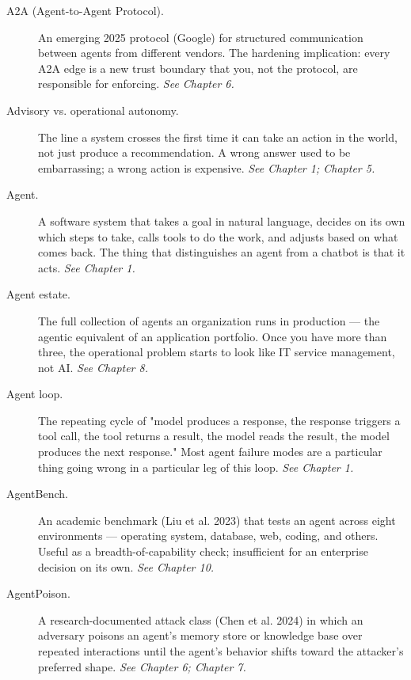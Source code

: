 \label{ch:glossary}

\starttwocol

\begin{description}
  \item[A2A (Agent-to-Agent Protocol).] An emerging 2025 protocol (Google) for structured communication between agents from different vendors. The hardening implication: every A2A edge is a new trust boundary that you, not the protocol, are responsible for enforcing. \textit{See Chapter 6.}
  \item[Advisory vs. operational autonomy.] The line a system crosses the first time it can take an action in the world, not just produce a recommendation. A wrong answer used to be embarrassing; a wrong action is expensive. \textit{See Chapter 1; Chapter 5.}
  \item[Agent.] A software system that takes a goal in natural language, decides on its own which steps to take, calls tools to do the work, and adjusts based on what comes back. The thing that distinguishes an agent from a chatbot is that it acts. \textit{See Chapter 1.}
  \item[Agent estate.] The full collection of agents an organization runs in production — the agentic equivalent of an application portfolio. Once you have more than three, the operational problem starts to look like IT service management, not AI. \textit{See Chapter 8.}
  \item[Agent loop.] The repeating cycle of "model produces a response, the response triggers a tool call, the tool returns a result, the model reads the result, the model produces the next response." Most agent failure modes are a particular thing going wrong in a particular leg of this loop. \textit{See Chapter 1.}
  \item[AgentBench.] An academic benchmark (Liu et al. 2023) that tests an agent across eight environments — operating system, database, web, coding, and others. Useful as a breadth-of-capability check; insufficient for an enterprise decision on its own. \textit{See Chapter 10.}
  \item[AgentPoison.] A research-documented attack class (Chen et al. 2024) in which an adversary poisons an agent's memory store or knowledge base over repeated interactions until the agent's behavior shifts toward the attacker's preferred shape. \textit{See Chapter 6; Chapter 7.}

\end{description}
